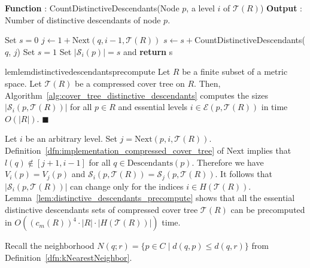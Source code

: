 \documentclass[a4paper,UKenglish,cleveref, autoref]{lipics-v2019}
\numberwithin{algocf}{section}
\theoremstyle{definition}
\theoremstyle{definition}
\theoremstyle{definition}
\theoremstyle{plain}
\newcommand{\Es}{\mathcal{E}}
\newcommand{\Desc}{\mathrm{Descendants}}
\newcommand{\nxt}{\mathrm{Next}}
\newcommand{\T}{\mathcal{T}}
\newcommand{\Sd}{\mathcal{S}}
\newcommand{\bs}{\hfill $\blacksquare$}
\begin{document}
\begin{algorithm}
\caption{This algorithm returns sizes of distinctive descendant set $\Sd_i(p, \T(R))$ for all essential levels $i \in \Es(p,\T(R))$}
\label{alg:cover_tree_distinctive_descendants}
\begin{algorithmic}[1]
\STATE \textbf{Function} : CountDistinctiveDescendants(Node $p$, a level $i$ of $\T(R)$)
\STATE \textbf{Output} : Number of distinctive descendants of node $p$. 

\IF{$i > l_{\min}(\T(Q))$}
\STATE Set $s = 0$
\STATE $j \leftarrow 1 + \nxt(q, i-1,\T(R))$
\STATE $s \leftarrow s + $CountDistinctiveDescendants($q$, $j$)
\ENDFOR
\ELSE
\STATE Set $s = 1$
\ENDIF
\STATE Set $|\Sd_i(p)| = s$ and \textbf{return} s
\end{algorithmic}
\end{algorithm}

\begin{restatable}{lem}{lemdistinctivedescendantsprecompute}
\label{lem:distinctive_descendants_precompute}
Let $R$ be a finite subset of a metric space.
Let $\T(R)$ be a compressed cover tree on $R$. 
Then, Algorithm~\ref{alg:cover_tree_distinctive_descendants} computes the sizes $|\Sd_{i}(p, \T(R))|$ for all $p \in R$ and essential levels $i \in \Es(p,\T(R))$ in time $O(|R|)$.
\bs
\end{restatable}

Let $i$ be an arbitrary level. Set $j =  \nxt(p,i, \T(R)) $.   
Definition~\ref{dfn:implementation_compressed_cover_tree} of $\nxt$ implies that $l(q) \notin [j+1,i-1]$ for all $q \in \Desc(p)$. Therefore we have $V_i(p) = V_j(p)$ and $\Sd_i(p, \T(R)) = \Sd_j(p, \T(R))$.  It follows that $|\Sd_i(p, \T(R))|$ can change only for the indices $i \in H(\T(R))$.  Lemma~\ref{lem:distinctive_descendants_precompute} shows that all the essential distinctive descendants sets of compressed cover tree $\T(R)$ can be precomputed in $O((c_m(R))^4\cdot|R| \cdot |H(\T(R))|)$ time.  
\medskip

Recall the neighborhood $N(q;r) = \{p \in C \mid d(q,p) \leq d(q,r)\}$ from Definition~\ref{dfn:kNearestNeighbor}.
\end{document}
